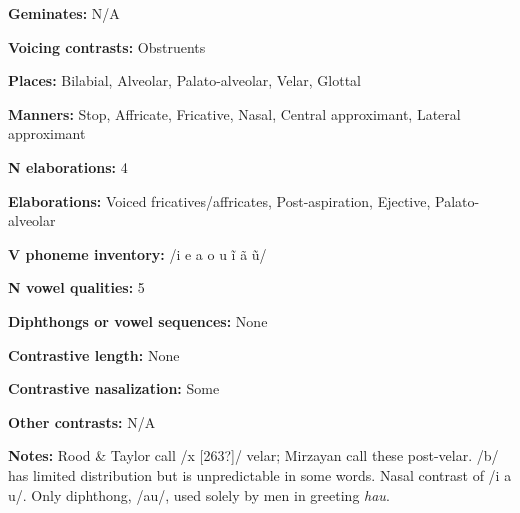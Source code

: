 \begin{styleBody}
\textbf{Geminates:} N/A
\end{styleBody}

\begin{styleBody}
\textbf{Voicing contrasts:} Obstruents
\end{styleBody}

\begin{styleBody}
\textbf{Places:} Bilabial, Alveolar, Palato-alveolar, Velar, Glottal
\end{styleBody}

\begin{styleBody}
\textbf{Manners:} Stop, Affricate, Fricative, Nasal, Central approximant, Lateral approximant
\end{styleBody}

\begin{styleBody}
\textbf{N elaborations:} 4
\end{styleBody}

\begin{styleBody}
\textbf{Elaborations:} Voiced fricatives/affricates, Post-aspiration, Ejective, Palato-alveolar
\end{styleBody}

\begin{styleBody}
\textbf{V phoneme inventory:} /i e a o u \~{i} \~{a} \~{u}/
\end{styleBody}

\begin{styleBody}
\textbf{N vowel qualities:} 5
\end{styleBody}

\begin{styleBody}
\textbf{Diphthongs or vowel sequences:} None
\end{styleBody}

\begin{styleBody}
\textbf{Contrastive length:} None
\end{styleBody}

\begin{styleBody}
\textbf{Contrastive nasalization:} Some
\end{styleBody}

\begin{styleBody}
\textbf{Other contrasts:} N/A
\end{styleBody}

\begin{styleBody}
\textbf{Notes:} Rood \& Taylor call /x [263?]/ velar; Mirzayan call these post-velar. /b/ has limited distribution but is unpredictable in some words. Nasal contrast of /i a u/. Only diphthong, /au/, used solely by men in greeting \textit{hau}.
\end{styleBody}

